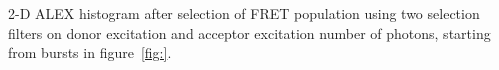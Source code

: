 2-D ALEX histogram after selection of FRET population using two selection filters on donor excitation and acceptor excitation number of photons, starting from bursts in figure~\ref{fig:}.
